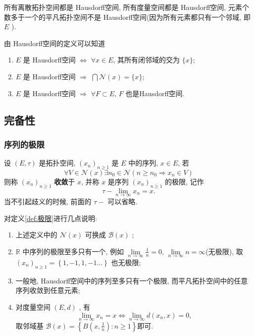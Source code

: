 \documentclass[lang=cn,10pt]{gorgeousnbook}
\numberwithin{equation}{section}%
\numberwithin{figure}{section}%
\begin{document}
\begin{exercise}
所有离散拓扑空间都是 Hausdorff空间, 所有度量空间都是 Hausdorff空间, 元素个数多于一个的平凡拓扑空间不是 Hausdorff空间(因为所有元素都只有一个邻域, 即 $ E$ ).
\end{exercise}

	
\begin{proposition}\label{prop:Hausdorff空间的相关命题1}
由 Hausdorff空间的定义可以知道
\begin{enumerate}[(1)]
  \item  $ E $ 是 Hausdorff空间 $ \Longleftrightarrow $ $ \forall x\in E $, 其所有闭邻域的交为 $\{ x \}$;
  \item $ E $ 是 Hausdorff空间 $ \Longrightarrow $ $\bigcap \mathcal{N}(x)=\{x\}$;
  \item $ E $ 是 Hausdorff空间 $ \Longrightarrow $ $ \forall F\subset E $, $ F $ 也是Hausdorff空间.
\end{enumerate}
\end{proposition}

\subsection{完备性}
\subsubsection{序列的极限}

\begin{definition}[极限]\label{def:极限}
设 $ (E, \tau) $ 是拓扑空间, $ (x_{n})_{n\geqslant 1} $ 是 $ E $ 中的序列,  $ x\in E $, 若
\[\forall V\in\mathcal{N}(x)\exists n_{0}\in\mathcal{N}(n\geqslant n_{0}\Rightarrow x_{n}\in V)\]
则称 $ (x_{n})_{n\geqslant1} $ \textbf{收敛}于 $ x $, 并称 $ x $ 是序列 $ (x_{n})_{n\geqslant 1} $ 的极限, 记作
\[\tau-\lim_{n\to \infty}x_{n}=x.\]
当不引起歧义的时候, 前面的 $ \tau- $ 可以省略.
\end{definition}
 
\begin{remark}
   对定义\ref{def:极限}进行几点说明:
   \begin{enumerate}[(1)]
      \item 上述定义中的 $ \mathcal{N}(x) $ 可换成 $ \mathcal{B}(x) $ ;
      \item $\mathbb{R}$ 中序列的极限至多只有一个, 例如 $\lim\limits_{n\to\infty}\frac{1}{n}=0 $, $ \lim\limits_{n\to\infty} n=\infty$(无极限), 取 $ (x_{n})_{n\geqslant1}=\left\{ 1, -1, 1,  -1\ldots \right\} $ 也无极限;
      \item\label{item:Hausdorff空间上极限唯一性} 一般地, Hausdorff空间中的序列至多只有一个极限, 而平凡拓扑空间中的任意序列收敛到任意元素;
      \item 对度量空间 $ (E, d) $ , 有
      \[
         \lim_{n\to \infty}x_{n}=x \Leftrightarrow \lim_{n\to\infty}d(x_{n}, x)=0,
      \]
      取邻域基 $ \mathcal{B}(x)=\left\{ B(x, \frac{1}{n}): n\geqslant1 \right\} $即可.
   \end{enumerate}
\end{remark}
 
\end{document}
